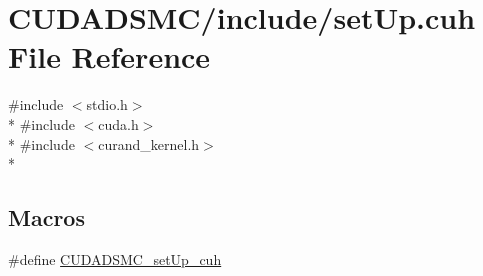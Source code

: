 \hypertarget{set_up_8cuh}{\section{C\+U\+D\+A\+D\+S\+M\+C/include/set\+Up.cuh File Reference}
\label{set_up_8cuh}
}
{\ttfamily \#include $<$stdio.\+h$>$}\\*
{\ttfamily \#include $<$cuda.\+h$>$}\\*
{\ttfamily \#include $<$curand\+\_\+kernel.\+h$>$}\\*
\subsection*{Macros}
\begin{DoxyCompactItemize}
\item 
\#define \hyperlink{set_up_8cuh_a8e794708e8c84134303c969fd48f72eb}{C\+U\+D\+A\+D\+S\+M\+C\+\_\+set\+Up\+\_\+cuh}
\end{DoxyCompactItemize}
